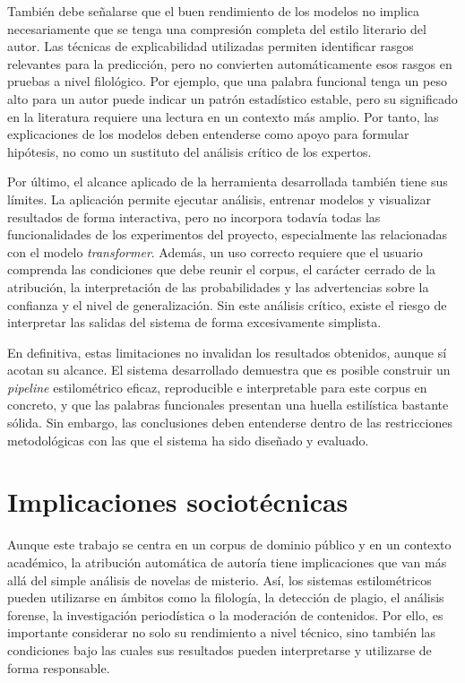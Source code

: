 \documentclass[IB]{TFUOC}%
\begin{document}
También debe señalarse que el buen rendimiento de los modelos no implica necesariamente que se tenga una compresión completa del estilo literario del autor. Las técnicas de explicabilidad utilizadas permiten identificar rasgos relevantes para la predicción, pero no convierten automáticamente esos rasgos en pruebas a nivel filológico. Por ejemplo, que una palabra funcional tenga un peso alto para un autor puede indicar un patrón estadístico estable, pero su significado en la literatura requiere una lectura en un contexto más amplio. Por tanto, las explicaciones de los modelos deben entenderse como apoyo para formular hipótesis, no como un sustituto del análisis crítico de los expertos.

Por último, el alcance aplicado de la herramienta desarrollada también tiene sus límites. La aplicación permite ejecutar análisis, entrenar modelos y visualizar resultados de forma interactiva, pero no incorpora todavía todas las funcionalidades de los experimentos del proyecto, especialmente las relacionadas con el modelo \textit{transformer}. Además, un uso correcto requiere que el usuario comprenda las condiciones que debe reunir el corpus, el carácter cerrado de la atribución, la interpretación de las probabilidades y las advertencias sobre la confianza y el nivel de generalización. Sin este análisis crítico, existe el riesgo de interpretar las salidas del sistema de forma excesivamente simplista.

En definitiva, estas limitaciones no invalidan los resultados obtenidos, aunque sí acotan su alcance. El sistema desarrollado demuestra que es posible construir un \textit{pipeline} estilométrico eficaz, reproducible e interpretable para este corpus en concreto, y que las palabras funcionales presentan una huella estilística bastante sólida. Sin embargo, las conclusiones deben entenderse dentro de las restricciones metodológicas con las que el sistema ha sido diseñado y evaluado.

\section{Implicaciones sociotécnicas}

Aunque este trabajo se centra en un corpus de dominio público y en un contexto académico, la atribución automática de autoría tiene implicaciones que van más allá del simple análisis de novelas de misterio. Así, los sistemas estilométricos pueden utilizarse en ámbitos como la filología, la detección de plagio, el análisis forense, la investigación periodística o la moderación de contenidos. Por ello, es importante considerar no solo su rendimiento a nivel técnico, sino también las condiciones bajo las cuales sus resultados pueden interpretarse y utilizarse de forma responsable.
\end{document}
